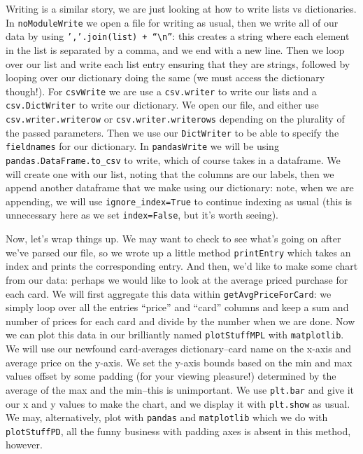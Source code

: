 \documentclass[12pt, twoside, reqno]{book}
\begin{document}
Writing is a similar story, we are just looking at how to write lists vs dictionaries. In \texttt{noModuleWrite} we open a file for writing as usual, then we write all of our data by using \texttt{','.join(list) + ``\textbackslash n''}: this creates a string where each element in the list is separated by a comma, and we end with a new line. Then we loop over our list and write each list entry ensuring that they are strings, followed by looping over our dictionary doing the same (we must access the dictionary though!). For \texttt{csvWrite} we are use a \texttt{csv.writer} to write our lists and a \texttt{csv.DictWriter} to write our dictionary. We open our file, and either use \texttt{csv.writer.writerow} or \texttt{csv.writer.writerows} depending on the plurality of the passed parameters. Then we use our \texttt{DictWriter} to be able to specify the \texttt{fieldnames} for our dictionary. In \texttt{pandasWrite} we will be using \texttt{pandas.DataFrame.to\_csv} to write, which of course takes in a dataframe. We will create one with our list, noting that the columns are our labels, then we append another dataframe that we make using our dictionary: note, when we are appending, we will use \texttt{ignore\_index=True} to continue indexing as usual (this is unnecessary here as we set \texttt{index=False}, but it's worth seeing).

Now, let's wrap things up. We may want to check to see what's going on after we've parsed our file, so we wrote up a little method \texttt{printEntry} which takes an index and prints the corresponding entry. And then, we'd like to make some chart from our data: perhaps we would like to look at the average priced purchase for each card. We will first aggregate this data within \texttt{getAvgPriceForCard}: we simply loop over all the entries ``price'' and ``card'' columns and keep a sum and number of prices for each card and divide by the number when we are done. Now we can plot this data in our brilliantly named \texttt{plotStuffMPL} with \texttt{matplotlib}. We will use our newfound card-averages dictionary--card name on the x-axis and average price on the y-axis. We set the y-axis bounds based on the min and max values offset by some padding (for your viewing pleasure!) determined by the average of the max and the min--this is unimportant. We use \texttt{plt.bar} and give it our x and y values to make the chart, and we display it with \texttt{plt.show} as usual. We may, alternatively, plot with \texttt{pandas} and \texttt{matplotlib} which we do with \texttt{plotStuffPD}, all the funny business with padding axes is absent in this method, however.
\end{document}
